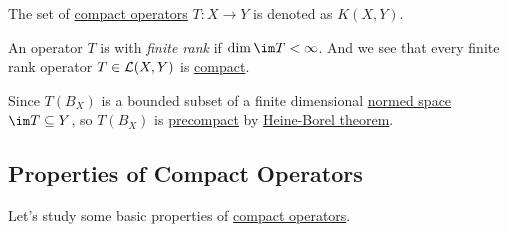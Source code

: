 \begin{notation}
	The set of \hyperref[def:compact-op]{compact operators} \(T\colon X\to Y\) is denoted as \(K(X, Y)\).
\end{notation}

\begin{remark}\label{rmk:finite-rank-op}
	An operator \(T\) is with \emph{finite rank} if \(\dim \im T < \infty \). And we see that every finite rank operator \(T\in \mathcal{\MakeUppercase{l}} (X, Y)\) is \hyperref[def:compact-op]{compact}.
\end{remark}
\begin{explanation}
	Since \(T(B_X)\) 	is a bounded subset of a finite dimensional \hyperref[def:normed-vector-space]{normed space} \(\im T \subseteq Y\), so \(T(B_X)\) is \hyperref[def:precompact]{precompact} by \hyperref[thm:Heine-Borel]{Heine-Borel theorem}.
\end{explanation}

\subsection{Properties of Compact Operators}
Let's study some basic properties of \hyperref[def:compact-op]{compact operators}.

